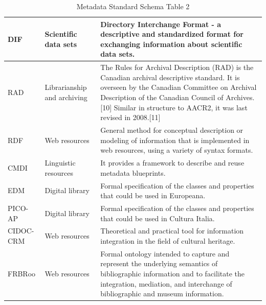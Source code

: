 \documentclass[epsfig,a4paper,12pt,titlepage]{book}
\begin{document}
\begin{table}[h]
\begin{adjustbox}{width=\textwidth}
\begin{tabular}{|p{1.5cm}|p{3.5cm}|p{14.0cm}|}
DIF & Scientific data sets & Directory Interchange Format - a descriptive and standardized format for exchanging information about scientific data sets. \\ \hline
RAD & Librarianship and archiving & The Rules for Archival Description (RAD) is the Canadian archival descriptive standard. It is overseen by the Canadian Committee on Archival Description of the Canadian Council of Archives.[10] Similar in structure to AACR2, it was last revised in 2008.[11] \\ \hline
RDF & Web resources & General method for conceptual description or modeling of information that is implemented in web resources, using a variety of syntax formats. \\ \hline
CMDI & Linguistic resources & It provides a framework to describe and reuse metadata blueprints. \\ \hline
EDM &  Digital library  & Formal specification of the classes and properties that could be used in Europeana. \\ \hline
PICO-AP &  Digital library  &  Formal specification of the classes and properties that could be used in Cultura Italia. \\ \hline
CIDOC-CRM & Web resources & Theoretical and practical tool for information integration in the field of cultural heritage. \\ \hline
FRBRoo & Web resources & Formal ontology intended to capture and represent the underlying semantics of bibliographic information and to facilitate the integration, mediation, and interchange of bibliographic and museum information. \\ \hline
\hline
    \end{tabular}
    \end{adjustbox}
    \caption{Metadata Standard Schema Table 2}
    \label{tab:metadata2}
\end{table}
\end{document}
